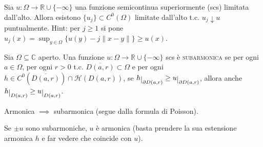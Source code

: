 \begin{exc} \label{succ_uj}
  Sia $u: \Omega \longrightarrow \mathbb{R}\cup\{-\infty\}$ una funzione semicontinua superiormente (scs) limitata dall'alto. Allora esistono $\{u_j\} \subset C^0(\Omega)$ limitate dall'alto t.c. $u_j \downarrow u$ puntualmente. Hint: per $j \ge 1$ si pone $\displaystyle u_j(x)=\sup_{y \in \Omega} \{u(y)-j\|x-y\|\} \ge u(x)$.
\end{exc}

\begin{defn}
  Sia $\Omega \subseteq \mathbb{C}$ aperto. Una funzione $u: \Omega \longrightarrow \mathbb{R}\cup\{-\infty\}$ scs è \textsc{subarmonica} se per ogni $a \in \Omega$, per ogni $r>0$ t.c. $\overline{D(a,r)} \subset \Omega$ e per ogni $h \in C^0(\overline{D(a,r)})\cap \mathcal{H}(D(a,r))$, se $h\restrict{\partial D(a,r)} \ge u\restrict{\partial D(a,r)}$, allora anche $h\restrict{D(a,r)} \ge u \restrict{D(a,r)}$.
\end{defn}

\begin{oss}
  Armonica $\implies$ subarmonica (segue dalla formula di Poisson).
\end{oss}

\begin{oss}
  Se $\pm u$ sono subarmoniche, $u$ è armonica (basta prendere la sua estensione armonica $h$ e far vedere che coincide con $u$).
\end{oss}

